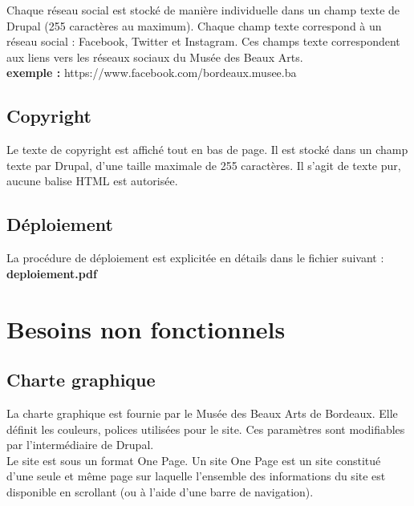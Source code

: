 \documentclass[11pt]{report}
\begin{document}
Chaque réseau social est stocké de manière individuelle dans un champ texte de
Drupal (255 caractères au maximum). Chaque champ texte correspond à un réseau
social : Facebook, Twitter et Instagram. Ces champs texte correspondent aux liens
vers les réseaux sociaux du Musée des Beaux Arts. \\
\textbf{exemple : } https://www.facebook.com/bordeaux.musee.ba

\subsection{Copyright}

Le texte de copyright est affiché tout en bas de page.
Il est stocké dans un champ texte par Drupal, d'une taille maximale de 255
caractères. Il s'agit de texte pur, aucune balise HTML est autorisée.


\subsection*{Déploiement}
La procédure de déploiement est explicitée en détails dans le fichier
suivant : \textbf{deploiement.pdf}


\section{Besoins non fonctionnels}

\subsection*{Charte graphique}

La charte graphique est fournie par le Musée des Beaux Arts de Bordeaux. Elle définit
les couleurs, polices utilisées pour le site. Ces paramètres sont modifiables par
l'intermédiaire de Drupal. \\
Le site est sous un format One Page. Un site One Page est un site constitué
d'une seule et même page sur laquelle l'ensemble des informations du site
est disponible en scrollant (ou à l'aide d'une barre de navigation).
\end{document}
